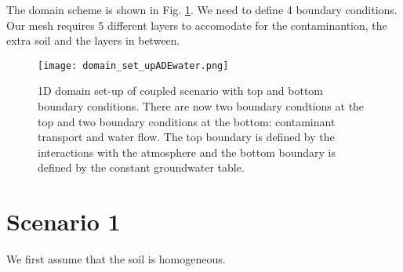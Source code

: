 \documentclass[
10pt, %
a4paper, %
oneside, %
headinclude,footinclude, %
BCOR5mm, %
]{scrartcl}
\begin{document}
The domain scheme is shown in Fig. \ref{domain}. We need to define 4 boundary conditions. Our mesh requires 5 different layers to accomodate for the contaminantion, the extra soil and the layers in between.

\begin{figure}[!h]
\centering
\texttt{[image: domain\_set\_upADEwater.png]}
\caption{\label{domain}1D domain set-up of coupled scenario with top and bottom boundary conditions. There are now two boundary condtions at the top and two boundary conditions at the bottom: contaminant transport and water flow. The top boundary is defined by the interactions with the atmosphere and the bottom boundary is defined by the constant groundwater table.}
\end{figure}

\section*{Scenario 1}

We first assume that the soil is homogeneous.
\end{document}
